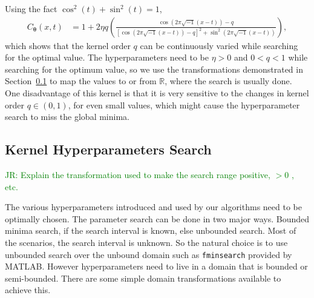 \documentclass{svjour3}                     %
\newcommand{\bm}[1]{\boldsymbol{#1}}
\newcommand{\reals}{\mathbb{R}}
\newcommand{\vtheta}{{\bm{\theta}}}
\newcommand{\code}[1]{\texttt{#1}}
\newcommand{\JRNote}[1]{{\textcolor{green}{JR: #1}}}
\begin{document}
Using the fact $\cos^2(t) + \sin^2(t) = 1$,
\begin{align*}
C_\vtheta(x, t) &= 
1 + 2 \eta q
\left(
\frac{ \cos({2 \pi\sqrt{-1} (x-t) }) - q }
{ \left[\cos({ 2 \pi\sqrt{-1} (x-t)})-q\right]^2 + \sin^2({ 2 \pi\sqrt{-1} (x-t)}) }
\right),
\end{align*}
which shows that the kernel order $q$ can be continuously varied while searching for the optimal value. 
The hyperparameters need to be $\eta > 0$ and $ 0 < q < 1$ while searching for the optimum value, so we use the transformations demonstrated in Section~\ref{sec:kernel_param_search} to map the values to or from $\reals$, where the search is usually done.
One disadvantage of this kernel is that it is very sensitive to the changes in kernel order $q \in (0,1)$, for even small values, which might cause the hyperparameter search to miss the global minima.



















\subsection{Kernel Hyperparameters Search}
\label{sec:kernel_param_search}

\JRNote{Explain the transformation used to make the search range positive, $> 0$ , etc.}

The various hyperparameters introduced and used by our algorithms need to be optimally chosen. %
The parameter search can be done in two major ways. 
Bounded minima search, if the search interval is known, else unbounded search.  Most of the scenarios, the search interval is unknown. So the natural choice is to use unbounded search over the unbound domain such as \code{fminsearch} provided by MATLAB.
However hyperparameters need to live in a domain that is bounded or semi-bounded. 
There are some simple domain transformations available to achieve this.
\end{document}
